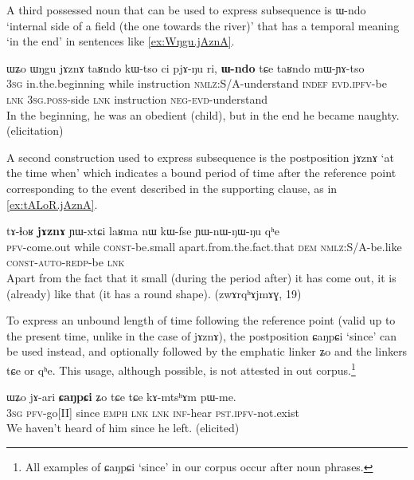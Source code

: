 \documentclass[oldfontcommands,oneside,a4paper,11pt]{article}
\newcommand{\ipa}[1]{{\phon \mbox{#1}}} %
\begin{document}
A third possessed noun that can be used to express subsequence is \ipa{ɯ-ndo} `internal side of a field (the one towards the river)' that has a temporal meaning `in the end' in sentences like \ref{ex:Wŋgu.jAznA}.

\begin{exe}
\ex \label{ex:Wŋgu.jAznA}
\gll 
\ipa{ɯʑo}  	\ipa{ɯŋgu}  	\ipa{jɤznɤ}  	\ipa{taʁndo}  	\ipa{kɯ-tso}  	\ipa{ci}  	\ipa{pjɤ-ŋu}  	\ipa{ri,}  	\ipa{\textbf{ɯ-ndo}}  	\ipa{tɕe}  	\ipa{taʁndo}  	\ipa{mɯ-ɲɤ-tso}  	\\
\textsc{3sg} in.the.beginning while instruction \textsc{nmlz}:S/A-understand \textsc{indef} \textsc{evd.ipfv}-be \textsc{lnk} \textsc{3sg.poss}-side \textsc{lnk} instruction \textsc{neg-evd}-understand \\
\glt In the beginning, he was an obedient (child), but in the end he became naughty. (elicitation)
\end{exe}

A second construction used to express subsequence is the postposition \ipa{jɤznɤ} `at the time when' which indicates a bound period of time after the reference point corresponding to the event described in the supporting clause, as in \ref{ex:tALoR.jAznA}.

\begin{exe}
\ex \label{ex:tALoR.jAznA}
\gll 
\ipa{tɤ-ɬoʁ}  	\ipa{\textbf{jɤznɤ}}  	\ipa{ɲɯ-xtɕi}  	\ipa{laʁma}  	\ipa{nɯ}  	\ipa{kɯ-fse}  	\ipa{ɲɯ-nɯ-ŋɯ-ŋu}  	\ipa{qʰe}  \\
\textsc{pfv}-come.out  while \textsc{const}-be.small apart.from.the.fact.that \textsc{dem} \textsc{nmlz}:S/A-be.like \textsc{const-auto-redp}-be \textsc{lnk} \\
\glt Apart from the fact that it small (during the period after) it has come out, it is (already) like that (it has a round shape). (zwɤrqʰɤjmɤɣ, 19)
	\end{exe}


 To express an unbound length of time following the reference point (valid up to the present time, unlike in the case of \ipa{jɤznɤ}), the postposition \ipa{ɕaŋpɕi} `since'  can be used instead, and optionally followed by the emphatic linker \ipa{ʑo} and the linkers \ipa{tɕe} or \ipa{qʰe}. This usage, although possible, is not attested in out corpus.\footnote{All examples of \ipa{ɕaŋpɕi} `since' in our corpus occur after noun phrases.}
  \begin{exe}
\ex \label{ex:jariCaNpCi} 
\gll
 \ipa{ɯʑo}   	\ipa{jɤ-ari}   	\textbf{\ipa{ɕaŋpɕi}}   	\ipa{ʑo}   	\ipa{tɕe}   	\ipa{tɕe}   	\ipa{kɤ-mtsʰɤm}   	\ipa{pɯ-me.}   	\\
\textsc{3sg} \textsc{pfv}-go[II] since \textsc{emph} \textsc{lnk}  \textsc{lnk} \textsc{inf}-hear \textsc{pst.ipfv}-not.exist \\
 \glt We haven't heard of him since he left. (elicited)
\end{exe}
 
\end{document}
